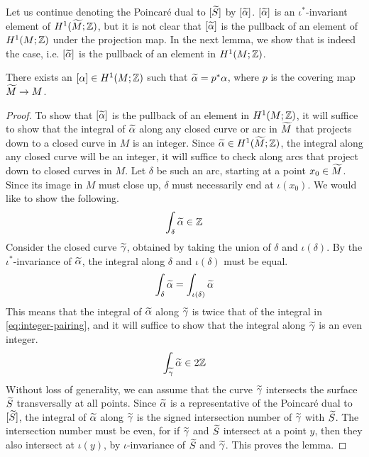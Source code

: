 Let us continue denoting the Poincar\'e dual to $[\widetilde{S}]$ by $[\widetilde{\alpha}]$.
$[\widetilde{\alpha}]$ is an $\iota^{\ast}$-invariant element of $H^1(\widetilde{M}; \mathbb{Z})$, but it is not clear that $[\widetilde{\alpha}]$ is the pullback of an element of $H^1(M; \mathbb{Z})$ under the projection map.
In the next lemma, we show that is indeed the case, i.e. $[\widetilde{\alpha}]$ is the pullback of an element in $H^1(M; \mathbb{Z})$.
\begin{lem}
  \label{lem:PD2}
  There exists an $[\alpha] \in H^1(M; \mathbb{Z})$ such that $\widetilde{\alpha} = p^{\ast} \alpha$, where $p$ is the covering map $\widetilde{M} \to M$.
\end{lem}
\begin{proof}
  To show that $[\widetilde{\alpha}]$ is the pullback of an element in $H^1(M; \mathbb{Z})$, it will suffice to show that the integral of $\widetilde{\alpha}$ along any closed curve or arc in $\widetilde{M}$ that projects down to a closed curve in $M$ is an integer.
  Since $\widetilde{\alpha} \in H^1(\widetilde{M}; \mathbb{Z})$, the integral along any closed curve will be an integer, it will suffice to check along arcs that project down to closed curves in $M$.
  Let $\delta$ be such an arc, starting at a point $x_0 \in \widetilde{M}$.
  Since its image in $M$ must close up, $\delta$ must necessarily end at $\iota(x_0)$.
  We would like to show the following.
  \begin{align}
    \label{eq:integer-pairing}
    \int_{\delta} \widetilde{\alpha} \in \mathbb{Z}
  \end{align}
  Consider the closed curve $\widetilde{\gamma}$, obtained by taking the union of $\delta$ and $\iota(\delta)$.
  By the $\iota^{\ast}$-invariance of $\widetilde{\alpha}$, the integral along $\delta$ and $\iota(\delta)$ must be equal.
  \begin{align*}
    \int_{\delta} \widetilde{\alpha} = \int_{\iota(\delta)} \widetilde{\alpha}
  \end{align*}
  This means that the integral of $\widetilde{\alpha}$ along $\widetilde{\gamma}$ is twice that of the integral in \eqref{eq:integer-pairing}, and it will suffice to show that the integral along $\widetilde{\gamma}$ is an even integer.
  \begin{align*}
    \int_{\widetilde{\gamma}} \widetilde{\alpha} \in 2\mathbb{Z}
  \end{align*}
  Without loss of generality, we can assume that the curve $\widetilde{\gamma}$ intersects the surface $\widetilde{S}$ transversally at all points.
  Since $\widetilde{\alpha}$ is a representative of the Poincar\'e dual to $[\widetilde{S}]$, the integral of $\widetilde{\alpha}$ along $\widetilde{\gamma}$ is the signed intersection number of $\widetilde{\gamma}$ with $\widetilde{S}$.
  The intersection number must be even, for if $\widetilde{\gamma}$ and $\widetilde{S}$ intersect at a point $y$, then they also intersect at $\iota(y)$, by $\iota$-invariance of $\widetilde{S}$ and $\widetilde{\gamma}$. This proves the lemma.
\end{proof}
